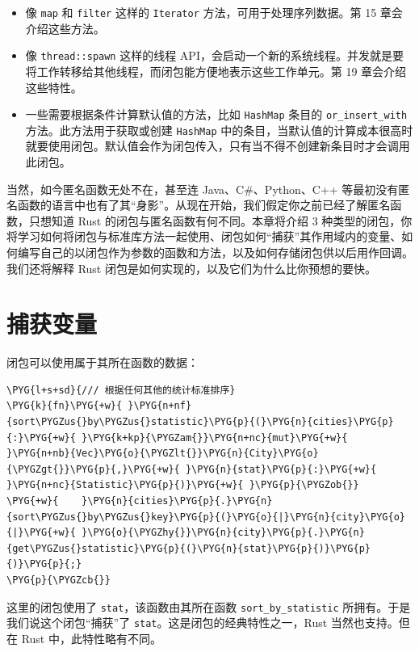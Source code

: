 \begin{itemize}
\item 像 \texttt{map} 和 \texttt{filter} 这样的 \texttt{Iterator} 方法，可用于处理序列数据。第 15 章会介绍这些方法。
\item 像 \texttt{thread::spawn} 这样的线程 API，会启动一个新的系统线程。并发就是要将工作转移给其他线程，而闭包能方便地表示这些工作单元。第 19 章会介绍这些特性。
\item 一些需要根据条件计算默认值的方法，比如 \texttt{HashMap} 条目的 \texttt{or\_insert\_with} 方法。此方法用于获取或创建 \texttt{HashMap} 中的条目，当默认值的计算成本很高时就要使用闭包。默认值会作为闭包传入，只有当不得不创建新条目时才会调用此闭包。
\end{itemize}

当然，如今匿名函数无处不在，甚至连 Java、C\#、Python、C++ 等最初没有匿名函数的语言中也有了其“身影”。从现在开始，我们假定你之前已经了解匿名函数，只想知道 Rust 的闭包与匿名函数有何不同。本章将介绍 3 种类型的闭包，你将学习如何将闭包与标准库方法一起使用、闭包如何“捕获”其作用域内的变量、如何编写自己的以闭包作为参数的函数和方法，以及如何存储闭包供以后用作回调。我们还将解释 Rust 闭包是如何实现的，以及它们为什么比你预想的要快。

\section{捕获变量}

闭包可以使用属于其所在函数的数据：

\begin{Verbatim}[commandchars=\\\{\},breaklines=true,breakanywhere=true,fontsize=\codefont,xleftmargin=17bp]
\PYG{l+s+sd}{/// 根据任何其他的统计标准排序}
\PYG{k}{fn}\PYG{+w}{ }\PYG{n+nf}{sort\PYGZus{}by\PYGZus{}statistic}\PYG{p}{(}\PYG{n}{cities}\PYG{p}{:}\PYG{+w}{ }\PYG{k+kp}{\PYGZam{}}\PYG{n+nc}{mut}\PYG{+w}{ }\PYG{n+nb}{Vec}\PYG{o}{\PYGZlt{}}\PYG{n}{City}\PYG{o}{\PYGZgt{}}\PYG{p}{,}\PYG{+w}{ }\PYG{n}{stat}\PYG{p}{:}\PYG{+w}{ }\PYG{n+nc}{Statistic}\PYG{p}{)}\PYG{+w}{ }\PYG{p}{\PYGZob{}}
\PYG{+w}{    }\PYG{n}{cities}\PYG{p}{.}\PYG{n}{sort\PYGZus{}by\PYGZus{}key}\PYG{p}{(}\PYG{o}{|}\PYG{n}{city}\PYG{o}{|}\PYG{+w}{ }\PYG{o}{\PYGZhy{}}\PYG{n}{city}\PYG{p}{.}\PYG{n}{get\PYGZus{}statistic}\PYG{p}{(}\PYG{n}{stat}\PYG{p}{)}\PYG{p}{)}\PYG{p}{;}
\PYG{p}{\PYGZcb{}}
\end{Verbatim}

这里的闭包使用了 \texttt{stat}，该函数由其所在函数 \texttt{sort\_by\_statistic} 所拥有。于是我们说这个闭包“捕获”了 \texttt{stat}。这是闭包的经典特性之一，Rust 当然也支持。但在 Rust 中，此特性略有不同。

